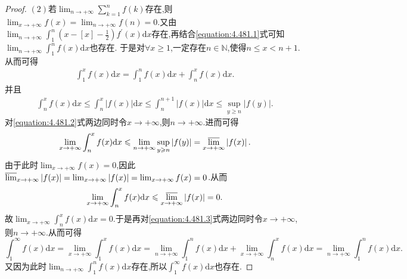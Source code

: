 \documentclass[../../main.tex]{subfiles}%
\begin{document}
\begin{proof}
\((2)\)若\(\lim_{n\rightarrow +\infty}\sum\limits_{k = 1}^n f(k)\)存在,则\(\lim_{x\rightarrow +\infty}f(x)=\lim_{n\rightarrow +\infty}f(n)=0\).又由\(\lim_{n\rightarrow +\infty}\int_1^n\left(x - [x] - \frac{1}{2}\right)f^\prime(x)\mathrm{d}x\)存在,再结合\eqref{equation:4.481.1}式可知\(\lim_{n\rightarrow +\infty}\int_1^n f(x)\mathrm{d}x\)也存在.
于是对\(\forall x\geqslant1\),一定存在\(n\in\mathbb{N}\),使得\(n\leqslant x < n + 1\).从而可得
\begin{align}\label{equation:4.481.3}
\int_1^x f(x)\mathrm{d}x=\int_1^n f(x)\mathrm{d}x+\int_n^x f(x)\mathrm{d}x. 
\end{align}
并且
\begin{align}\label{equation:4.481.2}
\int_n^x f(x)\mathrm{d}x\leqslant\int_n^x\left|f(x)\right|\mathrm{d}x\leqslant\int_n^{n + 1}\left|f(x)\right|\mathrm{d}x\leqslant\sup_{y\geqslant n}\left|f(y)\right|.
\end{align}
对\eqref{equation:4.481.2}式两边同时令\(x\rightarrow +\infty\),则\(n\rightarrow +\infty\).进而可得
\[
\lim_{x\rightarrow +\infty}\int_n^x f(x)\mathrm{d}x\leqslant\lim_{n\rightarrow +\infty}\sup_{y\geqslant n}\left|f(y)\right|={\varlimsup_{x\rightarrow +\infty}}\left|f(x)\right|.
\]
由于此时\(\lim_{x\rightarrow +\infty}f(x)=0\),因此\({\varlimsup_{x\rightarrow +\infty}}\left|f(x)\right|=\lim_{x\rightarrow +\infty}\left|f(x)\right|=\lim_{x\rightarrow +\infty}f(x)=0\).从而
\[
\lim_{x\rightarrow +\infty}\int_n^x f(x)\mathrm{d}x\leqslant{\varlimsup_{x\rightarrow +\infty}}\left|f(x)\right|=0.
\]
故\(\lim_{x\rightarrow +\infty}\int_n^x f(x)\mathrm{d}x = 0\).于是再对\eqref{equation:4.481.3}式两边同时令\(x\rightarrow +\infty\),则\(n\rightarrow +\infty\).从而可得
\[
\int_1^{\infty}f(x)\mathrm{d}x=\lim_{x\rightarrow +\infty}\int_1^x f(x)\mathrm{d}x=\lim_{n\rightarrow +\infty}\int_1^n f(x)\mathrm{d}x+\lim_{x\rightarrow +\infty}\int_n^x f(x)\mathrm{d}x=\lim_{n\rightarrow +\infty}\int_1^n f(x)\mathrm{d}x.
\]
又因为此时\(\lim_{n\rightarrow +\infty}\int_1^n f(x)\mathrm{d}x\)存在,所以\(\int_1^{\infty}f(x)\mathrm{d}x\)也存在.

\end{proof}
\end{document}
